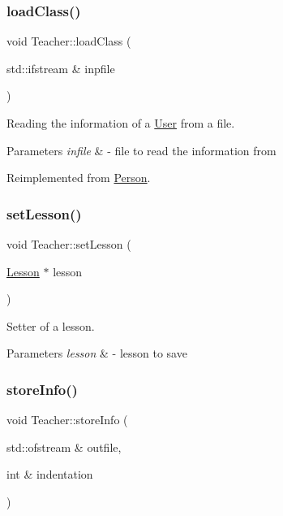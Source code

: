 \subsubsection{\texorpdfstring{load\+Class()}{loadClass()}}
{\footnotesize\ttfamily void Teacher\+::load\+Class (\begin{DoxyParamCaption}\item[{std\+::ifstream \&}]{inpfile }\end{DoxyParamCaption})\hspace{0.3cm}{\ttfamily [virtual]}}



Reading the information of a \mbox{\hyperlink{class_user}{User}} from a file. 


\begin{DoxyParams}{Parameters}
{\em infile} & -\/ file to read the information from \\
\hline
\end{DoxyParams}


Reimplemented from \mbox{\hyperlink{class_person_af07a032df8d56dddade4dc43960b536b}{Person}}.

\mbox{\label{class_teacher_aec95be6f77dc2b692627a6f4a5385971}} 
\subsubsection{\texorpdfstring{set\+Lesson()}{setLesson()}}
{\footnotesize\ttfamily void Teacher\+::set\+Lesson (\begin{DoxyParamCaption}\item[{\mbox{\hyperlink{class_lesson}{Lesson}} $\ast$}]{lesson }\end{DoxyParamCaption})}



Setter of a lesson. 


\begin{DoxyParams}{Parameters}
{\em lesson} & -\/ lesson to save \\
\hline
\end{DoxyParams}
\mbox{\label{class_teacher_a2ece0d60fa7ec4aaf93333aa0be0d25f}} 
\subsubsection{\texorpdfstring{store\+Info()}{storeInfo()}}
{\footnotesize\ttfamily void Teacher\+::store\+Info (\begin{DoxyParamCaption}\item[{std\+::ofstream \&}]{outfile,  }\item[{int \&}]{indentation }\end{DoxyParamCaption})\hspace{0.3cm}{\ttfamily [virtual]}}



